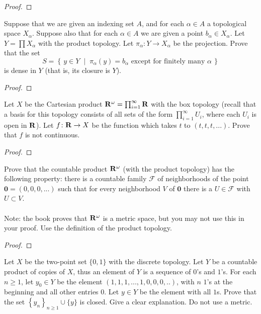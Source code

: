 \begin{proof}
\end{proof}
\begin{problem}
Suppose that we are given an indexing set $A$, and for each
$\alpha\in A$ a topological space $X_\alpha$. Suppose also that
for each $\alpha\in A$ we are given a point $b_\alpha\in
X_\alpha$. Let $Y=\prod X_\alpha$ with the product topology. Let
$\pi_\alpha\colon Y\to X_\alpha$ be the projection. Prove that
the set
\[
S=\left\{\,y\in Y\;\middle|\;\text{$\pi_\alpha(y)=b_\alpha$ except for
    finitely many $\alpha$}\,\right\}
\]
is dense in $Y$ (that is, its closure is $Y$).
\end{problem}
\begin{proof}
\end{proof}
\begin{problem}
Let $X$ be the Cartesian product
$\mathbf{R}^\omega=\prod_{i=1}^\infty\mathbf{R}$ with the box topology (recall
that a basis for this topology consists of all sets of the form
$\prod_{i=1}^\infty U_i$, where each $U_i$ is open in $\mathbf{R}$). Let
$f\colon\mathbf{R}\to X$ be the function which takes $t$ to
$(t,t,t,...)$. Prove that $f$ is not continuous.
\end{problem}
\begin{proof}
\end{proof}
\begin{problem}
Prove that the countable product $\mathbf{R}^\omega$ (with the product
topology) has the following property: there is a countable family
$\mathcal{F}$ of neighborhoods of the point
$\mathbf{0}=(0,0,0,...)$ such that for every neighborhood $V$ of
$\mathbf{0}$ there is a $U\in\mathcal{F}$ with $U\subset V$.
\\\\
Note: the book proves that $\mathbf{R}^\omega$ is a metric space, but
you may not use this in your proof. Use the definition of the
product topology.
\end{problem}
\begin{proof}
\end{proof}
\begin{problem}
Let $X$ be the two-point set $\{0,1\}$ with the discrete
topology. Let $Y$ be a countable product of copies of $X$, thus
an element of $Y$ is a sequence of $0$'s and $1$'s. For each
$n\geq 1$, let $y_0\in Y$ be the element
$(1,1,1,...,1,0,0,0,..)$, with $n$ $1$'s at the beginning and all
other entries $0$. Let $y\in Y$ be the element with all
$1$s. Prove that the set $\left\{y_n\right\}_{n\geq 1}\cup\{y\}$
is closed. Give a clear explanation. Do not use a metric.
\end{problem}
